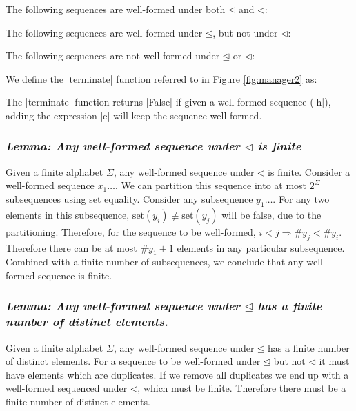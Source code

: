 \documentclass[draft]{sigplanconf}
\newcommand{\lemma}[1]{\subsubsection*{\textit{Lemma: #1}}}
\newcommand{\set}{\mathrm{set}}
\begin{document}
The following sequences are well-formed under both $\unlhd$ and $\lhd$:

\begin{code}
\end{code}

The following sequences are well-formed under $\unlhd$, but not under $\lhd$:

\begin{code}
\end{code}

The following sequences are not well-formed under $\unlhd$ or $\lhd$:

\begin{code}
\end{code}

We define the |terminate| function referred to in Figure \ref{fig:manager2} as:


The |terminate| function returns |False| if given a well-formed sequence (|h|), adding the expression |e| will keep the sequence well-formed.

\lemma{Any well-formed sequence under $\lhd$ is finite}

Given a finite alphabet $\Sigma$, any well-formed sequence under $\lhd$ is finite. Consider a well-formed sequence $x_1\ldots$. We can partition this sequence into at most $2^\Sigma$ subsequences using set equality. Consider any subsequence $y_1\ldots$. For any two elements in this subsequence, $\set(y_i) \not\equiv \set(y_j)$ will be false, due to the partitioning. Therefore, for the sequence to be well-formed, $i < j \Rightarrow \# y_j < \# y_i$. Therefore there can be at most $\#y_1+1$ elements in any particular subsequence. Combined with a finite number of subsequences, we conclude that any well-formed sequence is finite.

\lemma{Any well-formed sequence under $\unlhd$ has a finite number of distinct elements.}

Given a finite alphabet $\Sigma$, any well-formed sequence under $\unlhd$ has a finite number of distinct elements. For a sequence to be well-formed under $\unlhd$ but not $\lhd$ it must have elements which are duplicates. If we remove all duplicates we end up with a well-formed sequenced under $\lhd$, which must be finite. Therefore there must be a finite number of distinct elements.
\end{document}
